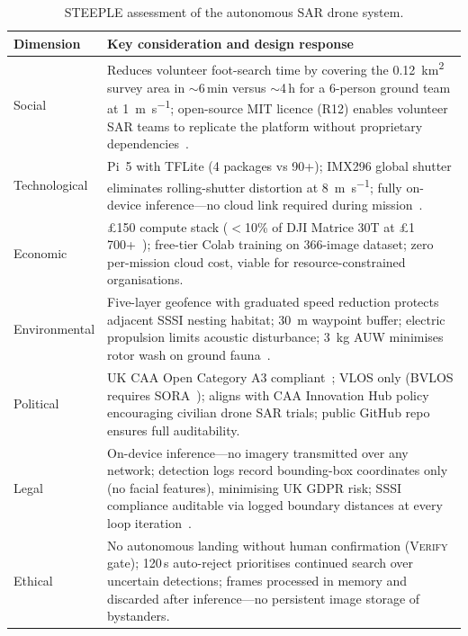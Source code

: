 \begin{table}[H]
  \centering\compactTable
  \caption{STEEPLE assessment of the autonomous SAR drone system.}\label{tab:steeple}
  \begin{tabularx}{\linewidth}{@{}l X@{}}
    \toprule
    \textbf{Dimension} & \textbf{Key consideration and design response} \\
    \midrule
    Social & Reduces volunteer foot-search time by covering the \SI{0.12}{\kilo\metre\squared} survey area in ${\sim}$6\,min versus ${\sim}$4\,h for a 6-person ground team at \SI{1}{\metre\per\second}; open-source MIT licence (R12) enables volunteer SAR teams to replicate the platform without proprietary dependencies~\cite{murphy2014}. \\
    Technological & Pi~5 with TFLite (4 packages vs 90+); IMX296 global shutter eliminates rolling-shutter distortion at \SI{8}{\metre\per\second}; fully on-device inference---no cloud link required during mission~\cite{edgeai, tflite}. \\
    Economic & \pounds150 compute stack ($<$10\% of DJI Matrice 30T at \pounds1\,700+~\cite{dji_m30t}); free-tier Colab training on 366-image dataset; zero per-mission cloud cost, viable for resource-constrained organisations. \\
    Environmental & Five-layer geofence with graduated speed reduction protects adjacent SSSI nesting habitat; \SI{30}{\metre} waypoint buffer; electric propulsion limits acoustic disturbance; \SI{3}{\kilo\gram} AUW minimises rotor wash on ground fauna~\cite{wca1981}. \\
    Political & UK CAA Open Category A3 compliant~\cite{caa2024uas}; VLOS only (BVLOS requires SORA~\cite{jarus2019sora}); aligns with CAA Innovation Hub policy encouraging civilian drone SAR trials; public GitHub repo ensures full auditability. \\
    Legal & On-device inference---no imagery transmitted over any network; detection logs record bounding-box coordinates only (no facial features), minimising UK GDPR risk; SSSI compliance auditable via logged boundary distances at every loop iteration~\cite{wca1981}. \\
    Ethical & No autonomous landing without human confirmation (\textsc{Verify} gate); 120\,s auto-reject prioritises continued search over uncertain detections; frames processed in memory and discarded after inference---no persistent image storage of bystanders. \\
    \bottomrule
  \end{tabularx}
\end{table}

